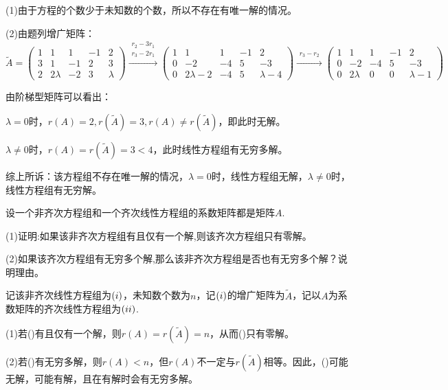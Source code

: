 \documentclass[a4paper]{report}
\begin{document}
\begin{jie}
(1)由于方程的个数少于未知数的个数，所以不存在有唯一解的情况。

(2)由题列增广矩阵：
\begin{equation*}
\widetilde{A}=
\begin{pmatrix}
1&1&1&-1&2\\
3&1&-1&2&3\\
2&2\lambda&-2&3&\lambda
\end{pmatrix}
\xrightarrow{\substack{r_2-3r_1\\ r_3-2r_1}}{
\begin{pmatrix}
1&1&1&-1&2\\
0&-2&-4&5&-3\\
0&2\lambda-2&-4&5&\lambda-4
\end{pmatrix}
}\xrightarrow{\substack{r_3-r_2}}{
\begin{pmatrix}
1&1&1&-1&2\\
0&-2&-4&5&-3\\
0&2\lambda&0&0&\lambda-1
\end{pmatrix}
}
\end{equation*}

由阶梯型矩阵可以看出：

$\lambda = 0$时，$r(A)=2,r(\widetilde{A})=3,r(A)\neq r(\widetilde{A})$，即此时无解。

$\lambda\neq 0$时，$r(A)=r(\widetilde{A})=3<4$，此时线性方程组有无穷多解。

综上所诉：该方程组不存在唯一解的情况，$\lambda=0$时，线性方程组无解，$\lambda\neq 0$时，线性方程组有无穷解。
\end{jie}

\EX 设一个非齐次方程组和一个齐次线性方程组的系数矩阵都是矩阵$A$.

(1)证明:如果该非齐次方程组有且仅有一个解,则该齐次方程组只有零解。

(2)如果该齐次方程组有无穷多个解,那么该非齐次方程组是否也有无穷多个解？说明理由。

\begin{zhengming}
记该非齐次线性方程组为$(\uppercase\expandafter{\romannumeral1})$，未知数个数为$n$，记$(\uppercase\expandafter{\romannumeral1})$的增广矩阵为$\widetilde{A}$，记以$A$为系数矩阵的齐次线性方程组为$(\uppercase\expandafter{\romannumeral2})$.

(1)若(\uppercase\expandafter{})有且仅有一个解，则$r(A)=r(\widetilde{A})=n$，从而(\uppercase\expandafter{})只有零解。

(2)若(\uppercase\expandafter{})有无穷多解，则$r(A)<n$，但$r(A)$不一定与$r(\widetilde{A})$相等。因此，(\uppercase\expandafter{})可能无解，可能有解，且在有解时会有无穷多解。
\end{zhengming}
\end{document}
